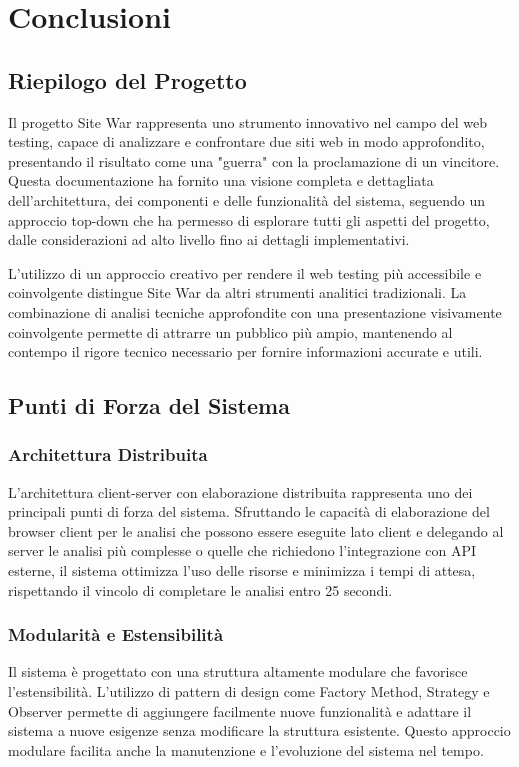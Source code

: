 \chapter{Conclusioni}

\section{Riepilogo del Progetto}
Il progetto Site War rappresenta uno strumento innovativo nel campo del web testing, capace di analizzare e confrontare due siti web in modo approfondito, presentando il risultato come una "guerra" con la proclamazione di un vincitore. Questa documentazione ha fornito una visione completa e dettagliata dell'architettura, dei componenti e delle funzionalità del sistema, seguendo un approccio top-down che ha permesso di esplorare tutti gli aspetti del progetto, dalle considerazioni ad alto livello fino ai dettagli implementativi.

L'utilizzo di un approccio creativo per rendere il web testing più accessibile e coinvolgente distingue Site War da altri strumenti analitici tradizionali. La combinazione di analisi tecniche approfondite con una presentazione visivamente coinvolgente permette di attrarre un pubblico più ampio, mantenendo al contempo il rigore tecnico necessario per fornire informazioni accurate e utili.

\section{Punti di Forza del Sistema}

\subsection{Architettura Distribuita}
L'architettura client-server con elaborazione distribuita rappresenta uno dei principali punti di forza del sistema. Sfruttando le capacità di elaborazione del browser client per le analisi che possono essere eseguite lato client e delegando al server le analisi più complesse o quelle che richiedono l'integrazione con API esterne, il sistema ottimizza l'uso delle risorse e minimizza i tempi di attesa, rispettando il vincolo di completare le analisi entro 25 secondi.

\subsection{Modularità e Estensibilità}
Il sistema è progettato con una struttura altamente modulare che favorisce l'estensibilità. L'utilizzo di pattern di design come Factory Method, Strategy e Observer permette di aggiungere facilmente nuove funzionalità e adattare il sistema a nuove esigenze senza modificare la struttura esistente. Questo approccio modulare facilita anche la manutenzione e l'evoluzione del sistema nel tempo.

